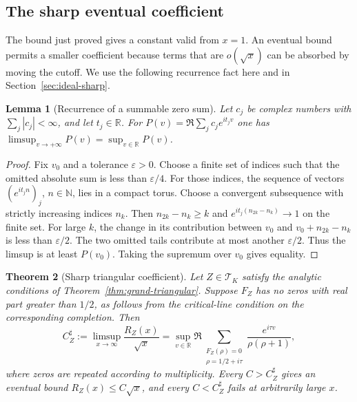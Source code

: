 \documentclass[11pt]{amsart}
\newtheorem{theorem}{Theorem}[section]
\newtheorem{lemma}[theorem]{Lemma}
\theoremstyle{definition}
\theoremstyle{remark}
\numberwithin{equation}{section}
\begin{document}
\subsection{The sharp eventual coefficient}\label{sec:triangular-sharp}

The bound just proved gives a constant valid from \(x=1\).
An eventual bound permits a smaller coefficient because terms
that are \(o(\sqrt{x})\) can be absorbed by moving the cutoff.
We use the following recurrence fact here and in
Section~\ref{sec:ideal-sharp}.

\begin{lemma}[Recurrence of a summable zero sum]
\label{lem:zero-sum-recurrence}
Let \(c_j\) be complex numbers with \(\sum_j|c_j|<\infty\),
and let \(t_j\in\mathbb R\). For
\(P(v)=\Re\sum_j c_j e^{it_jv}\) one has
\(\limsup_{v\to+\infty} P(v)=\sup_{v\in\mathbb R}P(v)\).
\end{lemma}

\begin{proof}
Fix \(v_0\) and a tolerance \(\varepsilon>0\).
Choose a finite set of indices such that the omitted absolute
sum is less than \(\varepsilon/4\).
For those indices, the sequence of vectors
\((e^{it_j n})_j\), \(n\in\mathbb N\), lies in a compact torus.
Choose a convergent subsequence with strictly increasing indices
\(n_k\). Then \(n_{2k}-n_k\ge k\) and
\(e^{it_j(n_{2k}-n_k)}\to1\) on the finite set.
For large \(k\), the change in its contribution between \(v_0\)
and \(v_0+n_{2k}-n_k\) is less than \(\varepsilon/2\).
The two omitted tails contribute at most another
\(\varepsilon/2\). Thus the limsup is at least \(P(v_0)\).
Taking the supremum over \(v_0\) gives equality.
\end{proof}

\begin{theorem}[Sharp triangular coefficient]
\label{thm:triangular-sharp}
Let \(Z\in\mathcal T_K\) satisfy the analytic conditions of
Theorem~\ref{thm:grand-triangular}. Suppose \(F_Z\) has no zeros with
real part greater than \(1/2\), as follows from the
critical-line condition on the corresponding completion.
Then
\begin{equation}\label{eq:triangular-sharp}
 C_Z^\sharp:=\limsup_{x\to\infty}\frac{R_Z(x)}{\sqrt{x}}
 =\sup_{v\in\mathbb R}\Re
   \sum_{\substack{F_Z(\rho)=0\\\rho=1/2+i\tau}}
       \frac{e^{i\tau v}}{\rho(\rho+1)},
\end{equation}
where zeros are repeated according to multiplicity.
Every \(C>C_Z^\sharp\) gives an eventual bound
\(R_Z(x)\le C\sqrt{x}\), and every \(C<C_Z^\sharp\) fails
at arbitrarily large \(x\).
\end{theorem}
\end{document}
